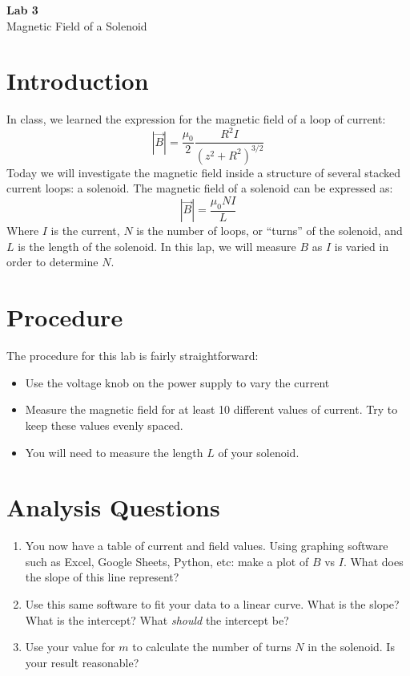 \documentclass{article}
\begin{document}
\fancyfoot[C]{\thepage}
\vspace*{0cm}
\begin{center}
	{\LARGE \textbf{Lab 3}}\\
	\vspace{.5cm}
	{\Large Magnetic Field of a Solenoid}
\end{center}

\section*{Introduction}
In class, we learned the expression for the magnetic field of a loop of current: 
\begin{equation*}
	|\vec{B}|=\frac{\mu_0}{2}\frac{R^2I}{\left(z^2+R^2\right)^{3/2}}
\end{equation*}
Today we will investigate the magnetic field inside a structure of several stacked current loops: a solenoid. The magnetic field of a solenoid can be expressed as:
\begin{equation}
	|\vec{B}|=\frac{\mu_0 NI}{L}
\end{equation}
Where $I$ is the current, $N$ is the number of loops, or ``turns'' of the solenoid, and $L$ is the length of the solenoid. In this lap, we will measure $B$ as $I$ is varied in order to determine $N$.

\section*{Procedure}
The procedure for this lab is fairly straightforward:
\begin{itemize}
	\item Use the voltage knob on the power supply to vary the current
	\item Measure the magnetic field for at least 10 different values of current. Try to keep these values evenly spaced.
	\item You will need to measure the length $L$ of your solenoid.
\end{itemize}

\section*{Analysis Questions}
\begin{enumerate}
	\item You now have a table of current and field values. Using graphing software such as Excel, Google Sheets, Python, etc: make a plot of $B$ vs $I$. What does the slope of this line represent?
	\item Use this same software to fit your data to a linear curve. What is the slope? What is the intercept? What \textit{should} the intercept be?
	\item Use your value for $m$ to calculate the number of turns $N$ in the solenoid. Is your result reasonable?
\end{enumerate}
\end{document}
